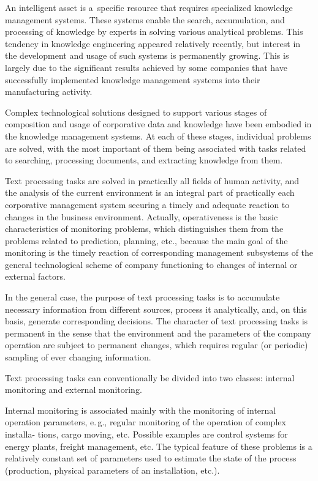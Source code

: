 \begin{multicols}{2}
{}
     
     An intelligent asset is a~specific resource that requires specialized 
knowledge management systems. These systems enable the search, accumulation, 
and processing of knowledge by experts in solving various analytical problems. 
This tendency in knowledge engineering appeared relatively recently, but interest 
in the development and usage of such systems is permanently growing. This is 
largely due to the significant results achieved by some companies that have 
successfully implemented knowledge management systems into their 
manufacturing activity.
     
     Complex technological solutions designed to support various stages of 
composition and usage of corporative data and knowledge have been embodied in 
the knowledge management systems. At each of these stages, individual problems 
are solved, with the most important of them being associated with tasks related to 
searching, processing documents, and extracting knowledge from them.
     
     Text processing tasks are solved in practically all fields of human activity, 
and the analysis of the current environment is an integral part of practically 
each 
corporative management system securing a timely and adequate reaction to 
changes in the business environment. Actually, operativeness is the basic 
characteristics of monitoring problems, which distinguishes them from the problems 
related to prediction, planning, etc., because the main goal of the monitoring is the 
timely reaction of corresponding management subsystems of the general 
technological scheme of company functioning to changes of internal or external 
factors.
     
     In the general case, the purpose of text processing tasks is to accumulate 
necessary information from different sources, process it analytically, and, on this 
basis, generate corresponding decisions. The character of text processing tasks is 
permanent in the sense that the environment and the parameters of the company 
operation are subject to permanent changes, which requires regular (or periodic) 
sampling of ever changing information.
     
     Text processing tasks can conventionally be divided into two classes: internal 
monitoring and external monitoring.
     
     Internal monitoring is associated mainly with the monitoring of internal 
operation parameters, e.\,g., regular monitoring of the operation of complex installa-
tions, cargo moving, etc. Possible examples are control systems for energy plants, 
freight management, etc. The typical feature of these problems is a relatively 
constant set of parameters used to estimate the state of the process (production, 
physical parameters of an installation, etc.).
     

\end{multicols}
